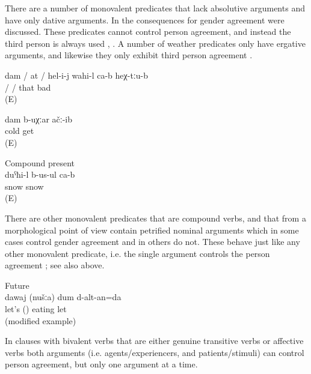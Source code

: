 There are a number of monovalent predicates that lack absolutive arguments and have only dative arguments. In  the consequences for gender agreement were discussed. These predicates cannot control person agreement, and instead the third person is always used , . A number of weather predicates only have ergative arguments, and likewise they only exhibit third person agreement .
%
\begin{exe}
	\ex	\label{ex:I / you / she /	he feel(s) bad there}
	\gll	dam	/	at	/ hel-i-j	wahi-l	ca-b	heχ-tːu-b\\
			/		/	that	bad		\\
	\glt	{} (E)

	\ex	\label{ex:‎‎‎I got cold agreement}
	\gll	dam	b-uχːar	ačː-ib\\
			cold	get\\
	\glt	{} (E)

	\ex	Compound present\\	\label{ex:It is snowing compound present}
	\gll	duˁħi-l	b-us-ul	ca-b\\
		snow	snow	\\
	\glt	{} (E)
\end{exe}

There are other monovalent predicates that are compound verbs, and that from a morphological point of view contain petrified nominal arguments which in some cases control gender agreement and in others do not. These behave just like any other monovalent predicate, i.e. the single argument controls the person agreement ; see also  above.
%
\begin{exe}
	\ex	Future\\	\label{ex:‎‎Come on, we will eat future}
	\gll	dawaj		(nušːa)	dum	d-alt-an=da\\
		let's		()	eating	let\\
	\glt	{} (modified example)
\end{exe}

In clauses with bivalent verbs that are either genuine transitive verbs or affective verbs both arguments (i.e. agents\slash experiencers, and patients\slash stimuli) can control person agreement, but only one argument at a time. 

